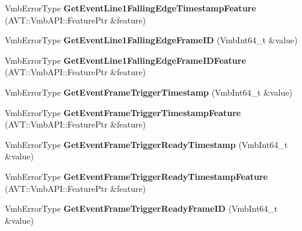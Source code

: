 \begin{DoxyCompactItemize}
\item 
\hypertarget{classMakoCamera_acdca52d29ebdd2f82ad7059f21c5bbd7}{Vmb\-Error\-Type {\bfseries Get\-Event\-Line1\-Falling\-Edge\-Timestamp\-Feature} (A\-V\-T\-::\-Vmb\-A\-P\-I\-::\-Feature\-Ptr \&feature)}\label{classMakoCamera_acdca52d29ebdd2f82ad7059f21c5bbd7}

\item 
\hypertarget{classMakoCamera_af3417c16d35b257c32839f21d256b8fd}{Vmb\-Error\-Type {\bfseries Get\-Event\-Line1\-Falling\-Edge\-Frame\-I\-D} (Vmb\-Int64\-\_\-t \&value)}\label{classMakoCamera_af3417c16d35b257c32839f21d256b8fd}

\item 
\hypertarget{classMakoCamera_a8734c08d4ce5c80af0213e22f438c49c}{Vmb\-Error\-Type {\bfseries Get\-Event\-Line1\-Falling\-Edge\-Frame\-I\-D\-Feature} (A\-V\-T\-::\-Vmb\-A\-P\-I\-::\-Feature\-Ptr \&feature)}\label{classMakoCamera_a8734c08d4ce5c80af0213e22f438c49c}

\item 
\hypertarget{classMakoCamera_a363a3311d772a261fe0cd6989d91a785}{Vmb\-Error\-Type {\bfseries Get\-Event\-Frame\-Trigger\-Timestamp} (Vmb\-Int64\-\_\-t \&value)}\label{classMakoCamera_a363a3311d772a261fe0cd6989d91a785}

\item 
\hypertarget{classMakoCamera_a6d7039619c00145672d48ca7ca08a643}{Vmb\-Error\-Type {\bfseries Get\-Event\-Frame\-Trigger\-Timestamp\-Feature} (A\-V\-T\-::\-Vmb\-A\-P\-I\-::\-Feature\-Ptr \&feature)}\label{classMakoCamera_a6d7039619c00145672d48ca7ca08a643}

\item 
\hypertarget{classMakoCamera_a2cdc7c61737275ba22f4074486c87dbc}{Vmb\-Error\-Type {\bfseries Get\-Event\-Frame\-Trigger\-Ready\-Timestamp} (Vmb\-Int64\-\_\-t \&value)}\label{classMakoCamera_a2cdc7c61737275ba22f4074486c87dbc}

\item 
\hypertarget{classMakoCamera_a5b6c56f385ebe5f47f1c96a5f2df877a}{Vmb\-Error\-Type {\bfseries Get\-Event\-Frame\-Trigger\-Ready\-Timestamp\-Feature} (A\-V\-T\-::\-Vmb\-A\-P\-I\-::\-Feature\-Ptr \&feature)}\label{classMakoCamera_a5b6c56f385ebe5f47f1c96a5f2df877a}

\item 
\hypertarget{classMakoCamera_a53eecb6ee82962a06aff80cdceb7324e}{Vmb\-Error\-Type {\bfseries Get\-Event\-Frame\-Trigger\-Ready\-Frame\-I\-D} (Vmb\-Int64\-\_\-t \&value)}\label{classMakoCamera_a53eecb6ee82962a06aff80cdceb7324e}


\end{DoxyCompactItemize}
